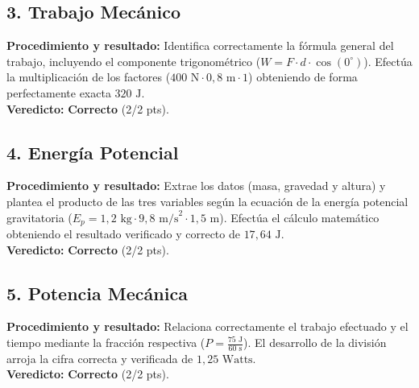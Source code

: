 \documentclass[12pt,letterpaper]{article}
\begin{document}
\subsection*{3. Trabajo Mecánico}
\textbf{Procedimiento y resultado:} Identifica correctamente la fórmula general del trabajo, incluyendo el componente trigonométrico ($W = F \cdot d \cdot \cos(0^\circ)$). Efectúa la multiplicación de los factores ($400 \text{ N} \cdot 0,8 \text{ m} \cdot 1$) obteniendo de forma perfectamente exacta $320 \text{ J}$. \\
\textbf{Veredicto:} \textbf{Correcto} (2/2 pts).

\subsection*{4. Energía Potencial}
\textbf{Procedimiento y resultado:} Extrae los datos (masa, gravedad y altura) y plantea el producto de las tres variables según la ecuación de la energía potencial gravitatoria ($E_p = 1,2 \text{ kg} \cdot 9,8 \text{ m/s}^2 \cdot 1,5 \text{ m}$). Efectúa el cálculo matemático obteniendo el resultado verificado y correcto de $17,64 \text{ J}$. \\
\textbf{Veredicto:} \textbf{Correcto} (2/2 pts).

\subsection*{5. Potencia Mecánica}
\textbf{Procedimiento y resultado:} Relaciona correctamente el trabajo efectuado y el tiempo mediante la fracción respectiva ($P = \frac{75 \text{ J}}{60 \text{ s}}$). El desarrollo de la división arroja la cifra correcta y verificada de $1,25 \text{ Watts}$. \\
\textbf{Veredicto:} \textbf{Correcto} (2/2 pts).

\vspace{0.5cm}
\end{document}
